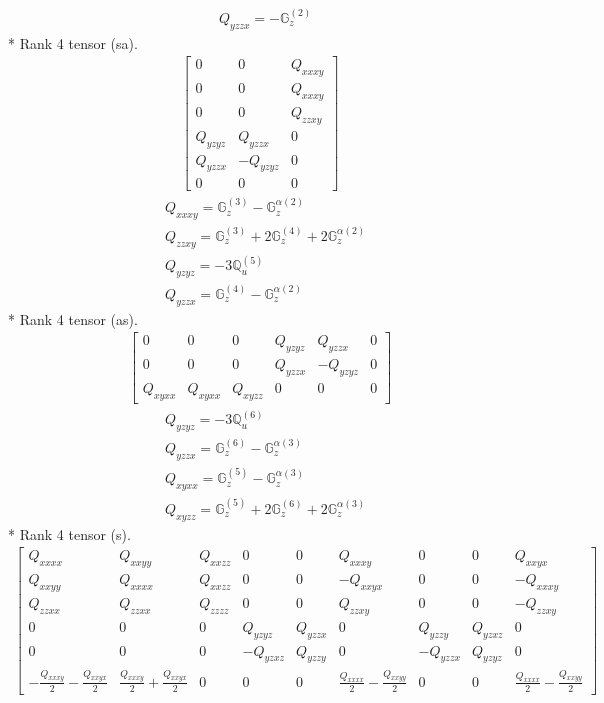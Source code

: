 \documentclass[fleqn,8pt,landscape]{jsarticle}
\begin{document}
\begin{align*}
& Q_{yzzx} = - \mathbb{G}_{z}^{(2)}
\end{align*}
* Rank 4 tensor (sa).
\begin{align*}
\begin{bmatrix} 0 & 0 & Q_{xxxy} \\ 0 & 0 & Q_{xxxy} \\ 0 & 0 & Q_{zzxy} \\ Q_{yzyz} & Q_{yzzx} & 0 \\ Q_{yzzx} & - Q_{yzyz} & 0 \\ 0 & 0 & 0 \end{bmatrix}
\end{align*}
\begin{align*}
& Q_{xxxy} = \mathbb{G}_{z}^{(3)} - \mathbb{G}_{z}^{\alpha(2)} \\
& Q_{zzxy} = \mathbb{G}_{z}^{(3)} + 2 \mathbb{G}_{z}^{(4)} + 2 \mathbb{G}_{z}^{\alpha(2)} \\
& Q_{yzyz} = - 3 \mathbb{Q}_{u}^{(5)} \\
& Q_{yzzx} = \mathbb{G}_{z}^{(4)} - \mathbb{G}_{z}^{\alpha(2)}
\end{align*}
* Rank 4 tensor (as).
\begin{align*}
\begin{bmatrix} 0 & 0 & 0 & Q_{yzyz} & Q_{yzzx} & 0 \\ 0 & 0 & 0 & Q_{yzzx} & - Q_{yzyz} & 0 \\ Q_{xyxx} & Q_{xyxx} & Q_{xyzz} & 0 & 0 & 0 \end{bmatrix}
\end{align*}
\begin{align*}
& Q_{yzyz} = - 3 \mathbb{Q}_{u}^{(6)} \\
& Q_{yzzx} = \mathbb{G}_{z}^{(6)} - \mathbb{G}_{z}^{\alpha(3)} \\
& Q_{xyxx} = \mathbb{G}_{z}^{(5)} - \mathbb{G}_{z}^{\alpha(3)} \\
& Q_{xyzz} = \mathbb{G}_{z}^{(5)} + 2 \mathbb{G}_{z}^{(6)} + 2 \mathbb{G}_{z}^{\alpha(3)}
\end{align*}
* Rank 4 tensor (s).
\begin{align*}
\begin{bmatrix} Q_{xxxx} & Q_{xxyy} & Q_{xxzz} & 0 & 0 & Q_{xxxy} & 0 & 0 & Q_{xxyx} \\ Q_{xxyy} & Q_{xxxx} & Q_{xxzz} & 0 & 0 & - Q_{xxyx} & 0 & 0 & - Q_{xxxy} \\ Q_{zzxx} & Q_{zzxx} & Q_{zzzz} & 0 & 0 & Q_{zzxy} & 0 & 0 & - Q_{zzxy} \\ 0 & 0 & 0 & Q_{yzyz} & Q_{yzzx} & 0 & Q_{yzzy} & Q_{yzxz} & 0 \\ 0 & 0 & 0 & - Q_{yzxz} & Q_{yzzy} & 0 & - Q_{yzzx} & Q_{yzyz} & 0 \\ - \frac{Q_{xxxy}}{2} - \frac{Q_{xxyx}}{2} & \frac{Q_{xxxy}}{2} + \frac{Q_{xxyx}}{2} & 0 & 0 & 0 & \frac{Q_{xxxx}}{2} - \frac{Q_{xxyy}}{2} & 0 & 0 & \frac{Q_{xxxx}}{2} - \frac{Q_{xxyy}}{2} \end{bmatrix}
\end{align*}
\end{document}
